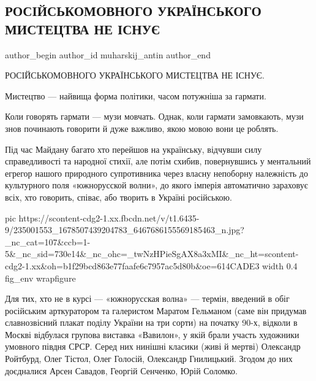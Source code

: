  
 
 
 
 
 
\subsection{РОСІЙСЬКОМОВНОГО УКРАЇНСЬКОГО МИСТЕЦТВА НЕ ІСНУЄ}
\label{sec:11_08_2021.fb.muharskij_antin.1.jazyk_isskustvo_ukraina}
 
\ifcmt
 author_begin
   author_id muharskij_antin
 author_end
\fi

РОСІЙСЬКОМОВНОГО УКРАЇНСЬКОГО МИСТЕЦТВА НЕ ІСНУЄ. 

Мистецтво — найвища форма політики, часом потужніша за гармати.

Коли говорять гармати — музи мовчать. Однак, коли гармати замовкають, музи знов
починають говорити й дуже важливо, якою мовою вони це роблять.

Під час Майдану багато хто перейшов на українську, відчувши силу справедливості
та народної стихії, але потім схибив, повернувшись у ментальний егрегор нашого
природного супротивника через власну непоборну належність до культурного поля
«южнорусской волни», до якого імперія автоматично зараховує всіх, хто говорить,
співає, або творить в Україні російською.

\ifcmt
  pic https://scontent-cdg2-1.xx.fbcdn.net/v/t1.6435-9/235001553_1678507439204783_6467686155569185463_n.jpg?_nc_cat=107&ccb=1-5&_nc_sid=730e14&_nc_ohc=_twNzHPieSgAX8a3xMI&_nc_ht=scontent-cdg2-1.xx&oh=b1f29bcd863e77faafe6c7957ac5d80b&oe=614CADE3
  width 0.4
	fig_env wrapfigure
\fi

Для тих, хто не в курсі — «южнорусская волна» — термін, введений в обіг
російським арткуратором та галеристом Маратом Гельманом (саме він придумав
славнозвісний плакат поділу України на три сорти) на початку 90-х, відколи в
Москві відбулася групова виставка «Вавилон», у якій брали участь художники
умовного півдня СРСР. Серед них нинішні класики (живі й мертві) Олександр
Ройтбурд, Олег Тістол, Олег Голосій, Олександр Гнилицький. Згодом до них
доєдналися Арсен Савадов, Георгій Сенченко, Юрій Соломко.

